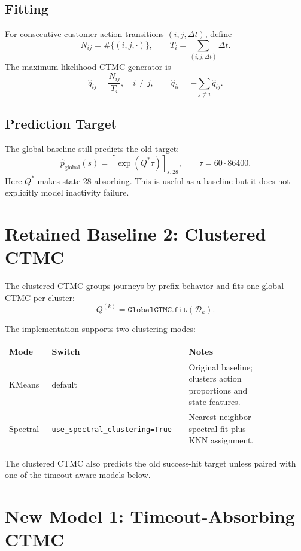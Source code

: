 \documentclass[11pt]{article}
\begin{document}
\subsection{Fitting}

For consecutive customer-action transitions $(i,j,\Delta t)$, define
\[
    N_{ij} = \#\{(i,j,\cdot)\}, \qquad
    T_i = \sum_{(i,j,\Delta t)} \Delta t.
\]
The maximum-likelihood CTMC generator is
\[
    \hat q_{ij} = \frac{N_{ij}}{T_i}, \quad i \neq j,
    \qquad
    \hat q_{ii} = -\sum_{j \neq i}\hat q_{ij}.
\]

\subsection{Prediction Target}

The global baseline still predicts the old target:
\[
    \hat p_{\text{global}}(s)
    =
    \left[\exp(Q^* \tau)\right]_{s,28},
    \qquad
    \tau = 60 \cdot 86400.
\]
Here $Q^*$ makes state 28 absorbing. This is useful as a baseline but it does
not explicitly model inactivity failure.

\section{Retained Baseline 2: Clustered CTMC}

The clustered CTMC groups journeys by prefix behavior and fits one global CTMC
per cluster:
\[
    Q^{(k)} = \texttt{GlobalCTMC.fit}(\mathcal{D}_k).
\]

The implementation supports two clustering modes:

\begin{center}
\begin{tabular}{p{0.15\linewidth}p{0.43\linewidth}p{0.30\linewidth}}
\toprule
Mode & Switch & Notes \\
\midrule
KMeans & default &
Original baseline; clusters action proportions and state features. \\
Spectral &
\texttt{use\_spectral\_clustering=True} &
Nearest-neighbor spectral fit plus KNN assignment. \\
\bottomrule
\end{tabular}
\end{center}

The clustered CTMC also predicts the old success-hit target unless paired with
one of the timeout-aware models below.

\section{New Model 1: Timeout-Absorbing CTMC}
\end{document}
